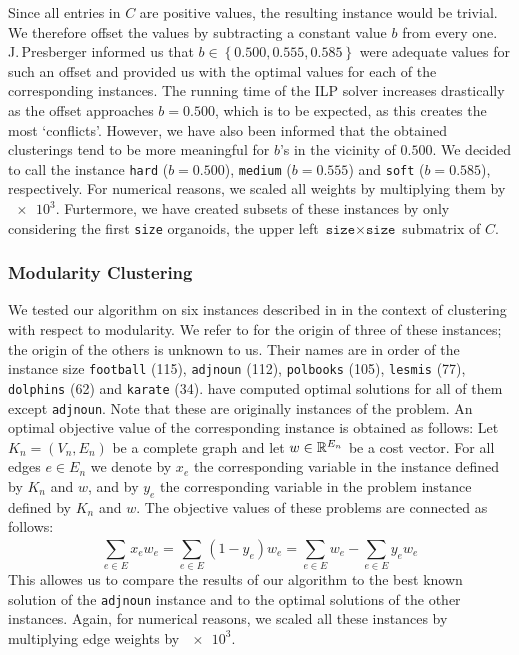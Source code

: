 Since all entries in $C$ are positive values, the resulting \CP instance would be trivial.
We therefore offset the values by subtracting a constant value $b$ from every one.
J.\,Presberger informed us that $b \in \left\{ 0.500, 0.555, 0.585 \right\}$ were adequate values for such an offset and provided us with the optimal values for each of the corresponding instances.
The running time of the ILP solver increases drastically as the offset approaches $b = 0.500$, which is to be expected, as this creates the most ‘conflicts’.
However, we have also been informed that the obtained clusterings tend to be more meaningful for $b$’s in the vicinity of $0.500$.
We decided to call the instance \texttt{hard} ($b= 0.500$), \texttt{medium} ($b = 0.555$) and \texttt{soft} ($b = 0.585$), respectively.
For numerical reasons, we scaled all weights by multiplying them by $\num{e3}$.
Furtermore, we have created subsets of these instances by only considering the first \texttt{size} organoids, \ie the upper left $\texttt{size} \times \texttt{size}$ submatrix of $C$.

\subsubsection{Modularity Clustering}
We tested our algorithm on six instances described in \cite{kappesComparativeStudyModern2015} in the context of clustering with respect to modularity.
We refer to \cite{brandesModularityClustering2008} for the origin of three of these instances; the origin of the others is unknown to us.
Their names are in order of the instance size \texttt{football} (115), \texttt{adjnoun} (112), \texttt{polbooks} (105), \texttt{lesmis} (77), \texttt{dolphins} (62) and \texttt{karate} (34).
\cite{kappesComparativeStudyModern2015} have computed optimal solutions for all of them except \texttt{adjnoun}.
Note that these are originally instances of the \MC problem.
An optimal objective value of the corresponding \CP instance is obtained as follows:
Let $K_{n} = (V_{n}, E_{n})$ be a complete graph and let $w \in \mathbb{R}^{E_{n}}$ be a cost vector.
For all edges $e \in E_{n}$ we denote by $x_{e}$ the corresponding variable in the \CP instance defined by $K_{n}$ and $w$, and by $y_{e}$ the corresponding variable in the \MC problem instance defined by $K_{n}$ and $w$.
The objective values of these problems are connected as follows:
\[
	\sum_{e \in E} x_{e} w_{e} = \sum_{e \in E}^{} (1-y_{e}) w_{e} = \sum_{e \in E}^{} w_{e} - \sum_{e \in E}^{} y_{e} w_{e}
\]
This allowes us to compare the results of our algorithm to the best known solution of the \texttt{adjnoun} instance and to the optimal solutions of the other instances. 
Again, for numerical reasons, we scaled all these instances by multiplying edge weights by $\num{e3}$.

